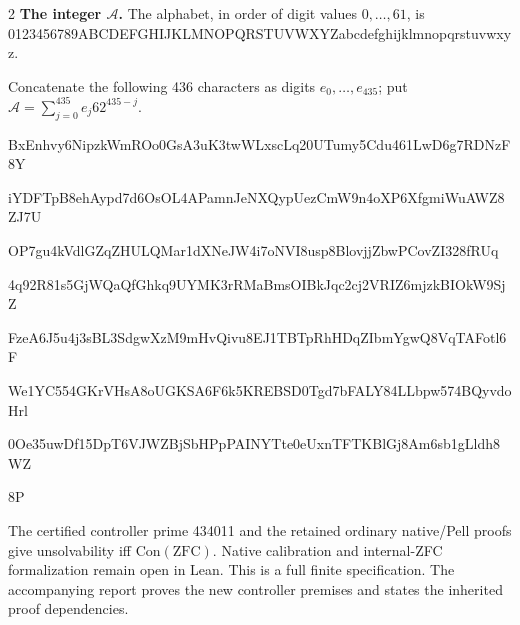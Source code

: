 \documentclass[10pt]{article}
\begin{document}
\begin{multicols}{2}
\textbf{The integer $\mathcal A$.}
The alphabet, in order of digit values $0,\ldots,61$, is
{\fontsize{7.7}{8.2}\selectfont\ttfamily 0123456789ABCDEFGHIJKLMNOPQRSTUVWXYZabcdefghijklmnopqrstuvwxyz}.\par
Concatenate the following 436 characters as digits $e_0,\ldots,e_{435}$;
put $\mathcal A=\sum_{j=0}^{435}e_j62^{435-j}$.\par
\begingroup\fontsize{7.7}{8.2}\selectfont\ttfamily
BxEnhvy6NipzkWmROo0GsA3uK3twWLxscLq20UTumy5Cdu461LwD6g7RDNzF8Y\par
iYDFTpB8ehAypd7d6OsOL4APamnJeNXQypUezCmW9n4oXP6XfgmiWuAWZ8ZJ7U\par
OP7gu4kVdlGZqZHULQMar1dXNeJW4i7oNVI8usp8BlovjjZbwPCovZI328fRUq\par
4q92R81s5GjWQaQfGhkq9UYMK3rRMaBmsOIBkJqc2cj2VRIZ6mjzkBIOkW9SjZ\par
FzeA6J5u4j3sBL3SdgwXzM9mHvQivu8EJ1TBTpRhHDqZIbmYgwQ8VqTAFotl6F\par
We1YC554GKrVHsA8oUGKSA6F6k5KREBSD0Tgd7bFALY84LLbpw574BQyvdoHrl\par
0Oe35uwDf15DpT6VJWZBjSbHPpPAINYTte0eUxnTFTKBlGj8Am6sb1gLldh8WZ\par
8P\par
\endgroup
\normalfont\fontsize{7.7}{8.2}\selectfont
The certified controller prime 434011 and the retained ordinary native/Pell proofs give
unsolvability iff $\mathrm{Con}(\mathrm{ZFC})$.
Native calibration and internal-ZFC formalization remain open in Lean.
This is a full finite specification. The accompanying report proves the new controller premises and states the inherited proof dependencies.
\end{multicols}
\end{document}
